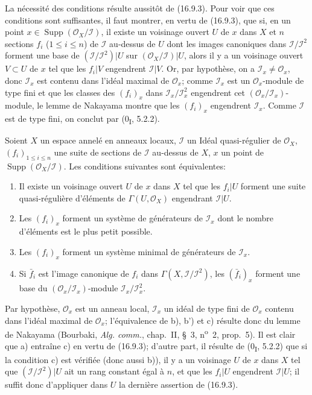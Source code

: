 La nécessité des conditions résulte aussitôt de (16.9.3). Pour voir que ces
conditions sont suffisantes, il faut montrer, en vertu de (16.9.3), que si, en
un point $x\in\operatorname{Supp}(\mathcal{O}_X/\mathscr{I})$, il existe un
voisinage ouvert $U$ de $x$ dans $X$ et $n$ sections $f_i$ ($1\leq i\leq n$)
de $\mathscr{I}$ au-dessus de $U$ dont les images canoniques dans
$\mathscr{I}/\mathscr{I}^2$ forment une base de
$(\mathscr{I}/\mathscr{I}^2)|U$ sur
$(\mathcal{O}_X/\mathscr{I})|U$, alors il y a un voisinage ouvert
$V\subset U$ de $x$ tel que les $f_i|V$ engendrent $\mathscr{I}|V$. Or, par
hypothèse, on a $\mathscr{I}_x\neq\mathcal{O}_x$, donc $\mathscr{I}_x$ est
contenu dans l'idéal maximal de $\mathcal{O}_x$; comme $\mathscr{I}_x$ est un
$\mathcal{O}_x$-module de type fini et que les classes des $(f_i)_x$ dans
$\mathscr{I}_x/\mathscr{I}_x^2$ engendrent cet
$(\mathcal{O}_x/\mathscr{I}_x)$-module, le lemme de Nakayama montre que les
$(f_i)_x$ engendrent $\mathscr{I}_x$. Comme $\mathscr{I}$ est de type fini,
on conclut par (0\textsubscript{I}, 5.2.2).

\begin{corollary}[16.9.5]
\label{IV.16.9.5}
Soient $X$ un espace annelé en anneaux locaux, $\mathscr{I}$ un Idéal
quasi-régulier de $\mathcal{O}_X$, $(f_i)_{1\leq i\leq n}$ une suite de
sections de $\mathscr{I}$ au-dessus de $X$,
$x$ un point de $\operatorname{Supp}(\mathcal{O}_X/\mathscr{I})$. Les
conditions suivantes sont équivalentes:
\begin{enumerate}
  \item[(a)] Il existe un voisinage ouvert $U$ de $x$ dans $X$ tel que les
  $f_i|U$ forment une suite quasi-régulière d'éléments de
  $\Gamma(U,\mathcal{O}_X)$ engendrant $\mathscr{I}|U$.
  \item[(b)] Les $(f_i)_x$ forment un système de générateurs de
  $\mathscr{I}_x$ dont le nombre d'éléments est le plus petit possible.
  \item[(b')] Les $(f_i)_x$ forment un système minimal de générateurs de
  $\mathscr{I}_x$.
  \item[(c)] Si $\bar f_i$ est l'image canonique de $f_i$ dans
  $\Gamma(X,\mathscr{I}/\mathscr{I}^2)$, les $(\bar f_i)_x$ forment une base
  du $(\mathcal{O}_x/\mathscr{I}_x)$-module
  $\mathscr{I}_x/\mathscr{I}_x^2$.
\end{enumerate}
\end{corollary}

Par hypothèse, $\mathcal{O}_x$ est un anneau local, $\mathscr{I}_x$ un idéal
de type fini de $\mathcal{O}_x$ contenu dans l'idéal maximal de
$\mathcal{O}_x$; l'équivalence de b), b') et c) résulte donc du lemme de
Nakayama (Bourbaki, \emph{Alg. comm.}, chap.~II, §~3,
n\textsuperscript{o}~2, prop.~5). Il est clair que a) entraîne c) en vertu de
(16.9.3); d'autre part, il résulte de (0\textsubscript{I}, 5.2.2) que si la
condition c) est vérifiée (donc aussi b)), il y a un voisinage $U$ de $x$ dans
$X$ tel que $(\mathscr{I}/\mathscr{I}^2)|U$ ait un rang constant égal à $n$,
et que les $f_i|U$ engendrent $\mathscr{I}|U$; il suffit donc d'appliquer dans
$U$ la dernière assertion de (16.9.3).

